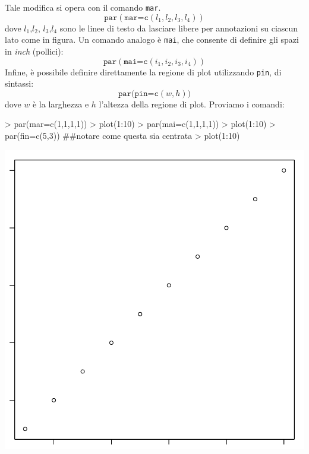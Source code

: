 \documentclass[onecolumn,11pt]{book}
\begin{document}
Tale modifica si opera con il comando \texttt{mar}.
\begin{equation}\texttt{par}(\texttt{mar=c}(l_1, l_2, l_3, l_4))
\end{equation}
dove $l_1$,$ l_2$, $l_3$,$ l_4$ sono le linee di testo da lasciare libere per annotazioni su ciascun lato come in figura. 
Un comando analogo \`e \texttt{mai}, che consente di definire gli spazi in {\it inch} (pollici):
\begin{equation}\texttt{par}(\texttt{mai=c}(i_1, i_2, i_3, i_4))\end{equation}
Infine, \`e possibile definire direttamente la regione di plot utilizzando \texttt{pin}, di sintassi:
\begin{equation*}
\texttt{par(pin=c}(w,h))\end{equation*}
dove $w$ \`e la larghezza e $h$ l'altezza della regione di plot.
Proviamo i comandi:


\begin{Schunk}
\begin{Sinput}
> par(mar=c(1,1,1,1))
> plot(1:10)
> par(mai=c(1,1,1,1))
> plot(1:10)
> par(fin=c(5,3)) ##notare come questa sia centrata
> plot(1:10)
\end{Sinput}
\end{Schunk}
\includegraphics{statisticaconR-379}
\end{document}
